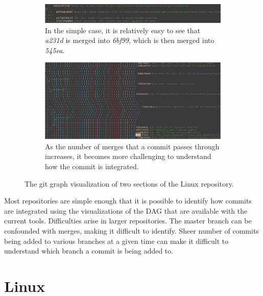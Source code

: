 \begin{figure}[htpb]
  \centering
  \begin{subfigure}[b]{0.8\textwidth}
    \includegraphics[width=\textwidth]{Figures/background/git_graph.png}
    \caption{In the simple case, it is relatively easy to see
      that \textit{a231d} is merged into \textit{6bf99},
      which is then merged into \textit{545ea}.}
    \label{fig:trivial_graph}
  \end{subfigure}

  \begin{subfigure}[b]{0.8\textwidth}
    \includegraphics[width=\textwidth]{Figures/background/git_graph_complex.png}
    \caption{As the number of merges that a commit passes through
      increases, it becomes more challenging to understand how the
      commit is integrated.}
  \end{subfigure}
  \caption{The git graph visualization of two sections of the Linux
    repository.}
  \label{fig:git_graphs}
\end{figure}

Most repositories are simple enough that it is possible to identify how
commits are integrated using the visualizations of the DAG that are
available with the current tools. Difficulties arise in larger
repositories. The master branch can be confounded with \foxtrot{}
merges, making it difficult to identify. Sheer number of commits being
added to various branches at a given time can make it difficult to
understand which branch a commit is being added to.

\section{Linux}\label{sec:linux}

